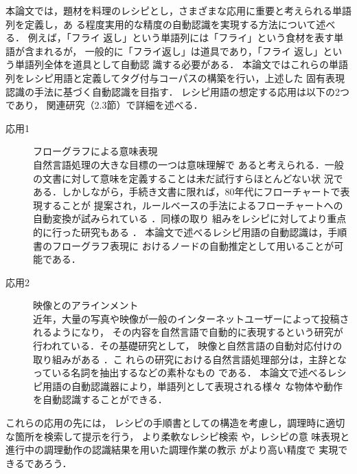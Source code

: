 \documentclass[japanese]{jnlp_1.4}
\begin{document}
本論文では，題材を料理のレシピとし，さまざまな応用に重要と考えられる単語列を定義し，あ
る程度実用的な精度の自動認識を実現する方法について述べる．
例えば，「フライ 返し」という単語列には「フライ」という食材を表す単語が含まれるが，
一般的に「フライ返し」は道具であり，「フライ 返し」という単語列全体を道具として自動認
識する必要がある．
本論文ではこれらの単語列をレシピ用語と定義してタグ付与コーパスの構築を行い，上述した
固有表現認識の手法に基づく自動認識を目指す．
レシピ用語の想定する応用は以下の2つであり，
関連研究（2.3節）で詳細を述べる．
\begin{description}

\item[応用1] フローグラフによる意味表現 \\
自然言語処理の大きな目標の一つは意味理解で
  あると考えられる．一般の文書に対して意味を定義することは未だ試行すらほとんどない状
  況である．しかしながら，手続き文書に限れば，80年代にフローチャートで表現することが
  提案され，ルールベースの手法によるフローチャートへの自動変換が試みられている
  \cite{Control.Structures.for.Actions.in.Procedural.Texts.and.PT-Chart}．同様の取り
  組みをレシピに対してより重点的に行った研究もある
  \cite{料理テキスト教材における調理手順の構造化}．
  本論文で述べるレシピ用語の自動認識は，手順書のフローグラフ表現に
  おけるノードの自動推定として用いることが可能である．

\item[応用2] 映像とのアラインメント \\
  近年，大量の写真や映像が一般のインターネットユーザーによって投稿されるようになり，
  その内容を自然言語で自動的に表現するという研究が行われている．その基礎研究として，
  映像と自然言語の自動対応付けの取り組みがある
  \cite{Translating.Video.Content.to.Natural.Language.Descriptions,
    Unsupervised.Alignment.of.Natural.Language.Instructions.with.Video.Segments}．こ
  れらの研究における自然言語処理部分は，主辞となっている名詞を抽出するなどの素朴なもの
  である．
  本論文で述べるレシピ用語の自動認識器により，単語列として表現される様々
  な物体や動作を自動認識することができる．

\end{description}
これらの応用の先には，
レシピの手順書としての構造を考慮し，調理時に適切な箇所を検索して提示を行う，
より柔軟なレシピ検索
\cite{Feature.Extraction.and.Summarization.of.Recipes.using.Flow.Graph}や，レシピの意
味表現と進行中の調理動作の認識結果を用いた調理作業の教示
\cite{Smart.Kitchen:.A.User.Centric.Cooking.Support.System}がより高い精度で
実現できるであろう．
\end{document}
